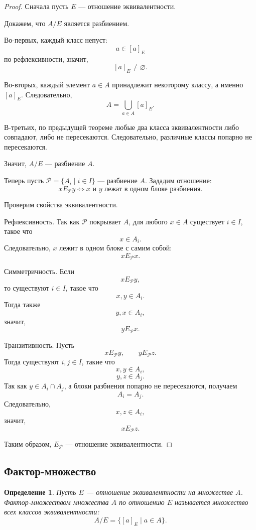 \documentclass[12pt,a4paper]{article}
\newtheorem{definition}{Определение}
\begin{document}
\begin{proof}
Сначала пусть $E$ --- отношение эквивалентности.

Докажем, что $A/E$ является разбиением.

Во-первых, каждый класс непуст:
\[
a\in [a]_E
\]
по рефлексивности, значит,
\[
[a]_E\ne\varnothing.
\]

Во-вторых, каждый элемент $a\in A$ принадлежит некоторому классу, а именно $[a]_E$.
Следовательно,
\[
A=\bigcup_{a\in A}[a]_E.
\]

В-третьих, по предыдущей теореме любые два класса эквивалентности либо совпадают, либо не пересекаются.
Следовательно, различные классы попарно не пересекаются.

Значит, $A/E$ --- разбиение $A$.

Теперь пусть $\mathcal P=\{A_i\mid i\in I\}$ --- разбиение $A$.
Зададим отношение:
\[
xE_{\mathcal P}y
\iff
x \text{ и } y \text{ лежат в одном блоке разбиения}.
\]

Проверим свойства эквивалентности.

Рефлексивность.
Так как $\mathcal P$ покрывает $A$, для любого $x\in A$ существует $i\in I$, такое что
\[
x\in A_i.
\]
Следовательно, $x$ лежит в одном блоке с самим собой:
\[
xE_{\mathcal P}x.
\]

Симметричность.
Если
\[
xE_{\mathcal P}y,
\]
то существуют $i\in I$, такое что
\[
x,y\in A_i.
\]
Тогда также
\[
y,x\in A_i,
\]
значит,
\[
yE_{\mathcal P}x.
\]

Транзитивность.
Пусть
\[
xE_{\mathcal P}y,\qquad yE_{\mathcal P}z.
\]
Тогда существуют $i,j\in I$, такие что
\[
x,y\in A_i,
\]
\[
y,z\in A_j.
\]
Так как $y\in A_i\cap A_j$, а блоки разбиения попарно не пересекаются, получаем
\[
A_i=A_j.
\]
Следовательно,
\[
x,z\in A_i,
\]
значит,
\[
xE_{\mathcal P}z.
\]

Таким образом, $E_{\mathcal P}$ --- отношение эквивалентности.
\end{proof}

\subsection{Фактор-множество}

\begin{definition}
Пусть $E$ --- отношение эквивалентности на множестве $A$.
\emph{Фактор-множеством} множества $A$ по отношению $E$ называется множество всех классов эквивалентности:
\[
A/E=\{[a]_E\mid a\in A\}.
\]
\end{definition}
\end{document}
